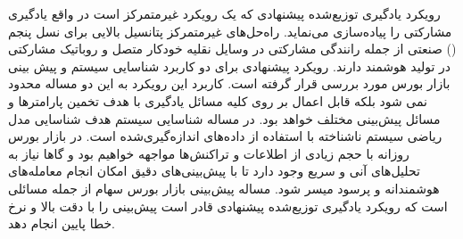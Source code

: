 رویکرد یادگیری توزیع‌شده پیشنهادی که یک رویکرد غیرمتمرکز است در واقع یادگیری مشارکتی را پیاده‌سازی می‌نماید. راه‌حل‌های غیرمتمرکز پتانسیل بالایی برای نسل پنجم () صنعتی از جمله رانندگی مشارکتی در وسایل نقلیه خودکار متصل و روباتیک مشارکتی در تولید هوشمند دارند. رویکرد پیشنهادی برای دو کاربرد شناسایی سیستم و پیش بینی بازار بورس مورد بررسی قرار گرفته است. کاربرد این رویکرد به این دو مساله محدود نمی شود بلکه قابل اعمال بر روی کلیه مسائل یادگیری با هدف تخمین پارامترها و مسائل پیش‌بینی مختلف خواهد بود. در مساله شناسایی سیستم هدف شناسایی مدل ریاضی سیستم ناشناخته با استفاده از داده‌های اندازه‌گیری‌شده است. در بازار بورس روزانه با حجم زیادی از اطلاعات و تراکنش‌ها مواجهه خواهیم بود و گاها نیاز به تحلیل‌های آنی و سریع وجود دارد تا‌‌ با پیش‌بینی‌های دقیق امکان انجام معامله‌های هوشمندانه و پرسود میسر شود. مساله پیش‌بینی بازار بورس سهام از جمله مسائلی است که رویکرد یادگیری توزیع‌شده پیشنهادی قادر است پیش‌بینی را با دقت بالا و نرخ خطا پایین انجام دهد.  

